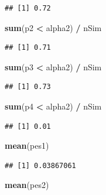 \documentclass[]{book}
\newenvironment{Shaded}{\begin{snugshade}}{\end{snugshade}}
\newcommand{\KeywordTok}[1]{\textcolor[rgb]{0.13,0.29,0.53}{\textbf{#1}}}
\newcommand{\NormalTok}[1]{#1}
\newcommand{\OperatorTok}[1]{\textcolor[rgb]{0.81,0.36,0.00}{\textbf{#1}}}
\newcommand{\StringTok}[1]{\textcolor[rgb]{0.31,0.60,0.02}{#1}}
\begin{document}
\begin{verbatim}
## [1] 0.72
\end{verbatim}

\begin{Shaded}
\begin{Highlighting}[]
\KeywordTok{sum}\NormalTok{(p2 }\OperatorTok{<}\StringTok{ }\NormalTok{alpha2) }\OperatorTok{/}\StringTok{ }\NormalTok{nSim}
\end{Highlighting}
\end{Shaded}

\begin{verbatim}
## [1] 0.71
\end{verbatim}

\begin{Shaded}
\begin{Highlighting}[]
\KeywordTok{sum}\NormalTok{(p3 }\OperatorTok{<}\StringTok{ }\NormalTok{alpha2) }\OperatorTok{/}\StringTok{ }\NormalTok{nSim}
\end{Highlighting}
\end{Shaded}

\begin{verbatim}
## [1] 0.73
\end{verbatim}

\begin{Shaded}
\begin{Highlighting}[]
\KeywordTok{sum}\NormalTok{(p4 }\OperatorTok{<}\StringTok{ }\NormalTok{alpha2) }\OperatorTok{/}\StringTok{ }\NormalTok{nSim}
\end{Highlighting}
\end{Shaded}

\begin{verbatim}
## [1] 0.01
\end{verbatim}

\begin{Shaded}
\begin{Highlighting}[]
\KeywordTok{mean}\NormalTok{(pes1)}
\end{Highlighting}
\end{Shaded}

\begin{verbatim}
## [1] 0.03867061
\end{verbatim}

\begin{Shaded}
\begin{Highlighting}[]
\KeywordTok{mean}\NormalTok{(pes2)}
\end{Highlighting}
\end{Shaded}
\end{document}
